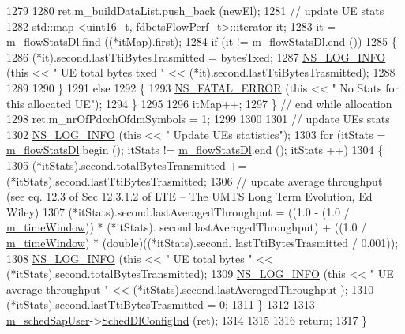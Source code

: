 \begin{DoxyCode}
1279 
1280       ret.m\_buildDataList.push\_back (newEl);
1281       \textcolor{comment}{// update UE stats}
1282       std::map <uint16\_t, fdbetsFlowPerf\_t>::iterator it;
1283       it = \hyperlink{classns3_1_1FdBetFfMacScheduler_a347c3f4c314a6791eef27d768927392a}{m\_flowStatsDl}.find ((*itMap).first);
1284       \textcolor{keywordflow}{if} (it != \hyperlink{classns3_1_1FdBetFfMacScheduler_a347c3f4c314a6791eef27d768927392a}{m\_flowStatsDl}.end ())
1285         \{
1286           (*it).second.lastTtiBytesTrasmitted = bytesTxed;
1287           \hyperlink{group__logging_gafbd73ee2cf9f26b319f49086d8e860fb}{NS\_LOG\_INFO} (\textcolor{keyword}{this} << \textcolor{stringliteral}{" UE total bytes txed "} << (*it).second.lastTtiBytesTrasmitted);
1288 
1289 
1290         \}
1291       \textcolor{keywordflow}{else}
1292         \{
1293           \hyperlink{group__fatal_ga5131d5e3f75d7d4cbfd706ac456fdc85}{NS\_FATAL\_ERROR} (\textcolor{keyword}{this} << \textcolor{stringliteral}{" No Stats for this allocated UE"});
1294         \}
1295 
1296       itMap++;
1297     \} \textcolor{comment}{// end while allocation}
1298   ret.m\_nrOfPdcchOfdmSymbols = 1;   
1299 
1300 
1301   \textcolor{comment}{// update UEs stats}
1302   \hyperlink{group__logging_gafbd73ee2cf9f26b319f49086d8e860fb}{NS\_LOG\_INFO} (\textcolor{keyword}{this} << \textcolor{stringliteral}{" Update UEs statistics"});
1303   \textcolor{keywordflow}{for} (itStats = \hyperlink{classns3_1_1FdBetFfMacScheduler_a347c3f4c314a6791eef27d768927392a}{m\_flowStatsDl}.begin (); itStats != \hyperlink{classns3_1_1FdBetFfMacScheduler_a347c3f4c314a6791eef27d768927392a}{m\_flowStatsDl}.end (); itStats
      ++)
1304     \{
1305       (*itStats).second.totalBytesTransmitted += (*itStats).second.lastTtiBytesTrasmitted;
1306       \textcolor{comment}{// update average throughput (see eq. 12.3 of Sec 12.3.1.2 of LTE – The UMTS Long Term Evolution, Ed
       Wiley)}
1307       (*itStats).second.lastAveragedThroughput = ((1.0 - (1.0 / \hyperlink{classns3_1_1FdBetFfMacScheduler_acc6dde5313aae9a6a40d72e7c883689c}{m\_timeWindow})) * (*itStats).
      second.lastAveragedThroughput) + ((1.0 / \hyperlink{classns3_1_1FdBetFfMacScheduler_acc6dde5313aae9a6a40d72e7c883689c}{m\_timeWindow}) * (double)((*itStats).second.
      lastTtiBytesTrasmitted / 0.001));
1308       \hyperlink{group__logging_gafbd73ee2cf9f26b319f49086d8e860fb}{NS\_LOG\_INFO} (\textcolor{keyword}{this} << \textcolor{stringliteral}{" UE total bytes "} << (*itStats).second.totalBytesTransmitted);
1309       \hyperlink{group__logging_gafbd73ee2cf9f26b319f49086d8e860fb}{NS\_LOG\_INFO} (\textcolor{keyword}{this} << \textcolor{stringliteral}{" UE average throughput "} << (*itStats).second.lastAveragedThroughput
      );
1310       (*itStats).second.lastTtiBytesTrasmitted = 0;
1311     \}
1312 
1313   \hyperlink{classns3_1_1FdBetFfMacScheduler_af2eac2234cc5c2b3d9999f9ec66911d3}{m\_schedSapUser}->\hyperlink{classns3_1_1FfMacSchedSapUser_a28f8484af5a32a45ee6c0e51770d83f7}{SchedDlConfigInd} (ret);
1314 
1315 
1316   \textcolor{keywordflow}{return};
1317 \}
\end{DoxyCode}


